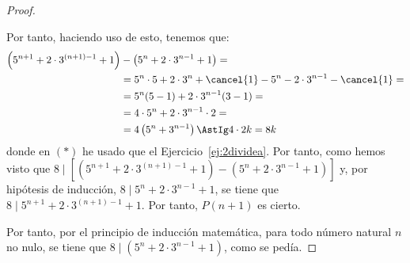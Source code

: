 \begin{ejercicio}
\begin{proof}
\begin{itemize}
                Por tanto, haciendo uso de esto, tenemos que:
                \begin{align*}
                    \left(5^{n+1} + 2\cdot 3^{(n+1)-1}+1\right) &- \left(5^n + 2\cdot 3^{n-1}+1\right) =\\
                    &= 5^n\cdot 5 + 2\cdot 3^{n}+\cancel{1} - 5^n - 2\cdot 3^{n-1} - \cancel{1} =\\
                    &= 5^n(5-1)+2\cdot 3^{n-1}(3-1) =\\
                    &= 4\cdot 5^n + 2\cdot 3^{n-1}\cdot 2 =\\
                    &= 4\left(5^n + 3^{n-1}\right)
                    \AstIg 4\cdot 2k = 8k
                \end{align*}
                donde en $(\ast)$ he usado que el Ejercicio~\ref{ej:2dividea}.
                Por tanto, como hemos visto que $8\mid \left[\left(5^{n+1} + 2\cdot 3^{(n+1)-1}+1\right) - \left(5^n + 2\cdot 3^{n-1}+1\right)\right]$ y, por hipótesis de inducción, $8\mid 5^n + 2\cdot 3^{n-1}+1$, se tiene que $8\mid 5^{n+1} + 2\cdot 3^{(n+1)-1}+1$.
                Por tanto, $P(n+1)$ es cierto.
            \end{itemize}
            Por tanto, por el principio de inducción matemática, para todo número natural $n$ no nulo, se tiene que $8\mid \left(5^n + 2\cdot 3^{n-1}+1\right)$, como se pedía.
    \end{proof}
\end{ejercicio}

